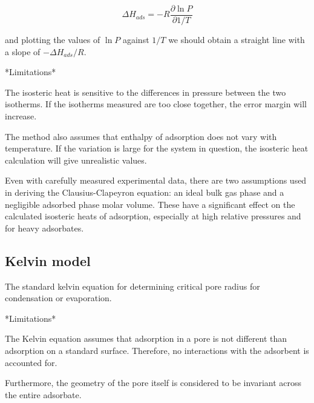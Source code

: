 \begin{equation}
    \Delta H_{ads} = - R \frac{\partial \ln P}{\partial 1 / T}
\end{equation}

and plotting the values of \(\ln P\) against \(1 / T\) we should obtain a straight
line with a slope of \(- \Delta H_{ads} / R.\)

*Limitations*

The isosteric heat is sensitive to the differences in pressure between the two isotherms. If
the isotherms measured are too close together, the error margin will increase.

The method also assumes that enthalpy of adsorption does not vary with temperature. If the
variation is large for the system in question, the isosteric heat calculation will give
unrealistic values.

Even with carefully measured experimental data, there are two assumptions used in deriving
the Clausius-Clapeyron equation: an ideal bulk gas phase and a negligible adsorbed phase
molar volume. These have a significant effect on the calculated isosteric heats of adsorption,
especially at high relative pressures and for heavy adsorbates.

\subsection{Kelvin model}

The standard kelvin equation for determining critical pore radius for condensation or
evaporation.

*Limitations*

The Kelvin equation assumes that adsorption in a pore is not different than adsorption
on a standard surface. Therefore, no interactions with the adsorbent is accounted for.

Furthermore, the geometry of the pore itself is considered to be invariant across the
entire adsorbate.